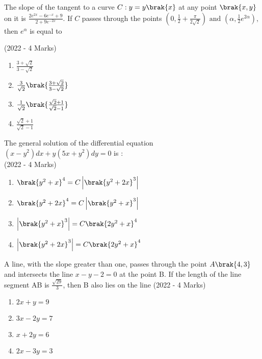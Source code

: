     \item{
	           The slope of the tangent to a curve $C : y = y\brak{x}$ at any point $\brak{x, y}$ on it is $\frac{2e^{2x}-6e^{-x}+9}{2+9e^{-2x}}$. If $C$ passes through the points $\left(0, \frac{1}{2}+\frac{\pi}{2\sqrt{2}}\right)\text{ and }\left(\alpha,\frac{1}{2}e^{2\alpha}\right),$ then $ e^\alpha $ is equal to 
            
             \hfill
                {(2022 - 4 Marks)}
            \begin{multicols}{2}
                \begin{enumerate}
                	\item $\frac{3+\sqrt{2}}{3-\sqrt{2}}$
                	\item $\frac{3}{\sqrt{2}}\brak{\frac{3+\sqrt{2}}{3-\sqrt{2}}}$
                	\item $\frac{1}{\sqrt{2}}\brak{\frac{\sqrt{2}+1}{\sqrt{2}-1}}$
                	\item $\frac{\sqrt{2}+1}{\sqrt{2}-1}$
                \end{enumerate}
            \end{multicols}
        
        }
    \item{
    		The general solution of the differential equation $(x - y^2)dx + y(5x + y^2)dy = 0$ is :\\ \text{ }
             \hfill
                {(2022 - 4 Marks)}
			\begin{multicols}{2}
				\begin{enumerate}
					\item $\brak{y^2+x}^4=C\left|\brak{y^2+2x}^3\right|$
					\item $\brak{y^2+2x}^4=C\left|\brak{y^2+x}^3\right|$
					\item $\left|\brak{y^2+x}^3\right|=C\brak{2y^2+x}^4$
					\item $\left|\brak{y^2+2x}^3\right|=C\brak{2y^2+x}^4$
				\end{enumerate}
			\end{multicols}
        
        }
    \item{
        	A line, with the slope greater than one, passes through the point $A\brak{4, 3}$ and intersects the line $x - y - 2 = 0$ at the point B. If the length of the line segment AB is $\frac{\sqrt{29}}{3}$, then B also lies on the line\hfill
                {(2022 - 4 Marks)}
				\begin{multicols}{4}
	                \begin{enumerate}
	                	\item $2x + y = 9$
	                	\item $3x - 2y = 7$
	                	\item $x + 2y = 6$
	                	\item $2x - 3y = 3$
	                \end{enumerate}
				\end{multicols}
        
        }
